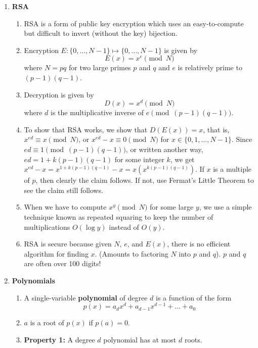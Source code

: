 \documentclass[10pt]{article}
\begin{document}
\begin{multicols}{2}
\begin{enumerate}
    \item \textbf{RSA}
    \begin{enumerate}
        \item RSA is a form of public key encryption which uses an easy-to-compute but difficult to invert (without the key) bijection.
        \item Encryption $E: \{0,\hdots,N-1\} \mapsto \{0,\hdots,N-1\}$ is given by $$E(x)=x^e \pmod{N}$$ where $N=pq$ for two large primes $p$ and $q$ and $e$ is relatively prime to $(p-1)(q-1)$.
        \item Decryption is given by $$D(x)=x^d \pmod{N}$$ where $d$ is the multiplicative inverse of $e \pmod{(p-1)(q-1)}$.
        \item To show that RSA works, we show that $D(E(x))=x$, that is, $x^{ed} \equiv x \pmod{N}$, or $x^{ed} - x \equiv 0 \pmod{N}$ for $x \in\{0,1, \ldots, N-1\}$. Since $ed \equiv 1 \pmod{(p-1)(q-1)}$, or written another way, $ed = 1 + k(p-1)(q-1)$ for some integer $k$, we get $x^{ed} - x = x^{1 + k(p-1)(q-1)} - x = x(x^{k(p-1)(q-1)})$. If $x$ is a multiple of $p$, then clearly the claim follows. If not, use Fermat's Little Theorem to see the claim still follows. 
        \item When we have to compute $x^y \pmod{N}$ for some large $y$, we use a simple technique known as repeated squaring to keep the number of multiplications $O(\log y)$ instead of $O(y)$.
        \item RSA is secure because given $N$, $e$, and $E(x)$, there is no efficient algorithm for finding $x$. (Amounts to factoring $N$ into $p$ and $q$). $p$ and $q$ are often over 100 digits!
    \end{enumerate}
    \newpage
    \item \textbf{Polynomials} 
    \begin{enumerate}
    \item A single-variable \textbf{polynomial} of degree $d$ is a function of the form $$p(x)=a_dx^d+a_{d-1}x^{d-1}+\hdots+a_0$$ \item $a$ is a root of $p(x)$ if $p(a)=0$.
    \item \textbf{Property 1:} A degree $d$ polynomial has at most $d$ roots. \\
    

\end{enumerate}
\end{enumerate}
\end{multicols}
\end{document}
